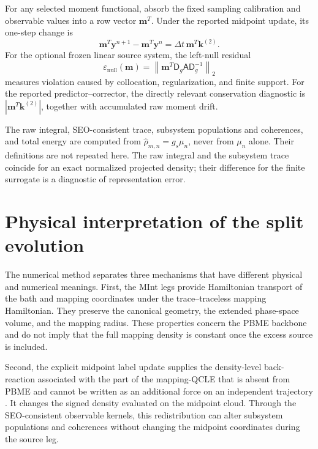 \documentclass[
  11pt,
  letterpaper,
  onehalfspacing,
  normalmargins,
  equalmargins,
  oneside
]{ut-thesis}
\begin{document}
For any selected moment functional, absorb the fixed sampling calibration and
observable values into a row vector \(\mathbf m^T\). Under the reported
midpoint update, its one-step change is
\begin{equation}
\mathbf m^T\mathbf y^{n+1}
-
\mathbf m^T\mathbf y^n
=
\Delta t\,\mathbf m^T\mathbf k^{(2)}.
\label{eq:ch5-discrete-moment-rate}
\end{equation}
For the optional frozen linear source system, the left-null residual
\begin{equation}
\varepsilon_{\mathrm{null}}(\mathbf m)
=
\left\|
\mathbf m^T
\mathsf D_g \mathsf A \mathsf D_g^{-1}
\right\|_2
\label{eq:ch5-left-null-residual}
\end{equation}
measures violation caused by collocation, regularization, and finite support.
For the reported predictor--corrector, the directly relevant conservation
diagnostic is \(|\mathbf m^T\mathbf k^{(2)}|\), together with accumulated raw
moment drift.

The raw integral, SEO-consistent trace, subsystem populations and coherences,
and total energy are computed from \(\widehat{\rho}_{m,n}=g_s\mu_n\), never from
\(\mu_n\) alone. Their definitions are not repeated here. The raw integral
and the subsystem trace coincide for an exact normalized projected density;
their difference for the finite surrogate is a diagnostic of representation
error.


\section{Physical interpretation of the split evolution}
\label{sec:ch5-physical-interpretation}

The numerical method separates three mechanisms that have different physical
and numerical meanings.  First, the MInt legs provide Hamiltonian transport of
the bath and mapping coordinates under the trace--traceless
mapping Hamiltonian. They preserve the canonical geometry, the extended
phase-space volume, and the mapping radius. These properties concern the
PBME backbone and do not imply that the full mapping density is constant once
the excess source is included.

Second, the explicit midpoint label update supplies the density-level
back-reaction associated with the part of the mapping-QCLE
that is absent from PBME and cannot be written as an additional force on an
independent trajectory \cite{NassimiBonellaKapral2010,Kelly2012JCP}. It
changes the signed density evaluated on the midpoint cloud. Through the
SEO-consistent observable kernels, this redistribution can alter subsystem
populations and coherences without changing the midpoint coordinates during
the source leg.
\end{document}
